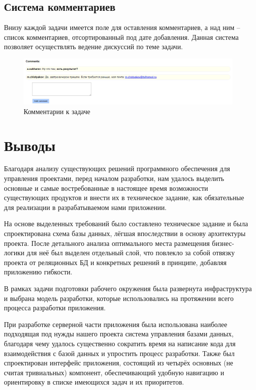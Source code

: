 \documentclass[a4paper, 14pt]{extarticle}
\begin{document}
\subsection{Система комментариев}

Внизу каждой задачи имеется поле для оставления комментариев, а над ним -- список комментариев, отсортированный под дате добавления. Данная система позволяет осуществлять ведение дискуссий по теме задачи.

\begin{figure}[!htb]
  \centering
    \includegraphics[scale=0.6]{../shared_images/frontend/comments.png}
   \caption{Комментарии к задаче}
    \label{fig:start}
\end{figure}

\newpage


\section{Выводы}
Благодаря анализу существующих решений программного обеспечения для управления проектами, перед началом разработки, нам удалось выделить основные и самые востребованные в настоящее время возможности существующих продуктов и внести их в техническое задание, как обязательные для реализации в разрабатываемом нами приложении.

На основе выделенных требований было составлено техническое задание и была спроектирована схема базы данных, лёгшая впоследствии в основу архитектуры проекта. После детального анализа оптимального места размещения бизнес-логики для неё был выделен отдельный слой, что повлекло за собой отвязку проекта от реляционных БД и конкретных решений в принципе, добавляя приложению гибкости.

В рамках задачи подготовки рабочего окружения была развернута инфраструктура и выбрана модель разработки, которые использовались на протяжении всего процесса разработки приложения.

При разработке серверной части приложения была использована наиболее подходящая под нужды нашего проекта система управления базами данных, благодаря чему удалось существенно сократить время на написание кода для взаимодействия с базой данных и упростить процесс разработки. Также был спроектирован интерфейс приложения, состоящий из четырёх основных (не считая тривиальных) компонент, обеспечивающий удобную навигацию и ориентировку в списке имеющихся задач и их приоритетов.
\end{document}

